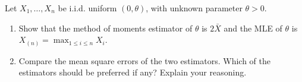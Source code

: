 
\begin{exercise}

Let $X_1, \dots, X_n$ be i.i.d. uniform $(0, \theta)$, with unknown parameter $\theta > 0$.

\begin{enumerate}[label = (\alph*)]

    \item Show that the method of moments estimator of $\theta$ is $2 \bar X$ and the MLE of $\theta$ is $X_{(n)} = \max_{1 \leq i \leq n} X_i$.

    \item Compare the mean square errors of the two estimators.
    Which of the estimators should be preferred if any?
    Explain your reasoning.

\end{enumerate}

\end{exercise}


